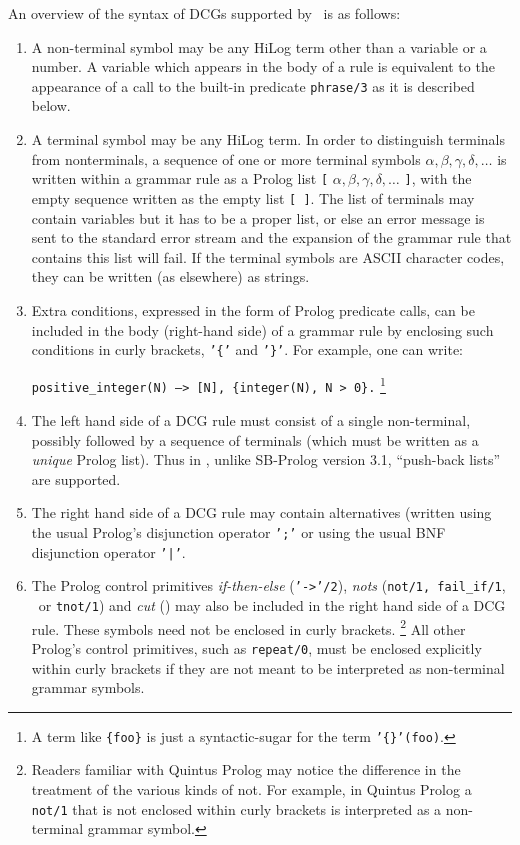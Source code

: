 An overview of the syntax of DCGs supported by \ourprolog\ is as follows:
\begin{enumerate}
\item A non-terminal symbol may be any HiLog term other than a variable
      or a number. A variable which appears in the body of a rule is 
      equivalent to the appearance of a call to the built-in predicate 
      {\tt phrase/3} as it is described below.
\item A terminal symbol may be any HiLog term. In order to distinguish 
      terminals from nonterminals, a sequence of one or more terminal
      symbols   $\alpha, \beta, \gamma, \delta, \ldots$
      is written within a grammar rule as a Prolog list 
         {\tt [} $\alpha, \beta, \gamma, \delta, \ldots$ {\tt ]},
      with the empty sequence written as the empty list {\tt [\,]}.
      The list of terminals may contain variables but it has to be a 
      proper list, or else an error message is sent to the standard 
      error stream and the expansion of the grammar rule that contains 
      this list will fail. If the terminal symbols are ASCII character
      codes, they can be written (as elsewhere) as strings.
\item Extra conditions, expressed in the form of Prolog predicate calls, 
      can be included in the body (right-hand side) of a grammar rule by 
      enclosing such conditions in curly brackets, {\tt '\{'} and {\tt '\}'}.
      For example, one can write:
      \begin{center}
                {\tt positive\_integer(N) --> [N], \{integer(N), N > 0\}.}
                \footnote{A term like {\tt \{foo\}} is just a syntactic-sugar
                          for the term {\tt '\{\}'(foo)}.}
      \end{center}
\item The left hand side of a DCG rule must consist of a single non-terminal,
      possibly followed by a sequence of terminals (which must be written as
      a {\em unique} Prolog list). Thus in \ourprolog, unlike SB-Prolog 
      version 3.1, ``push-back lists'' are supported.
\item The right hand side of a DCG rule may contain alternatives (written 
      using the usual Prolog's disjunction operator {\tt ';'} or 
      using the usual BNF disjunction operator {\tt '|'}. 
\item The Prolog control primitives {\em if-then-else} ({\tt '->'/2}),
      {\em nots} ({\tt not/1, fail\_if/1}, \not\ or {\tt tnot/1}) and 
      {\em cut} (\cut) may also be included in the 
      right hand side of a DCG rule. These symbols need not be enclosed in 
      curly brackets. 
      \footnote{Readers familiar with Quintus Prolog may notice the difference
                in the treatment of the various kinds of not. For example, in 
                Quintus Prolog a {\tt not/1} that is not enclosed within curly 
                brackets is interpreted as a non-terminal grammar symbol.}
      All other Prolog's control primitives, such as {\tt repeat/0}, must
      be enclosed explicitly within curly brackets if they are not meant
      to be interpreted as non-terminal grammar symbols.
\end{enumerate}
 


